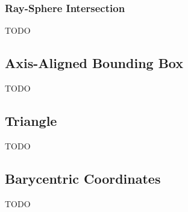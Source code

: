\subsubsection{Ray-Sphere Intersection}
TODO

\subsection{Axis-Aligned Bounding Box}
TODO

\subsection{Triangle}
TODO

\subsection{Barycentric Coordinates}
TODO


